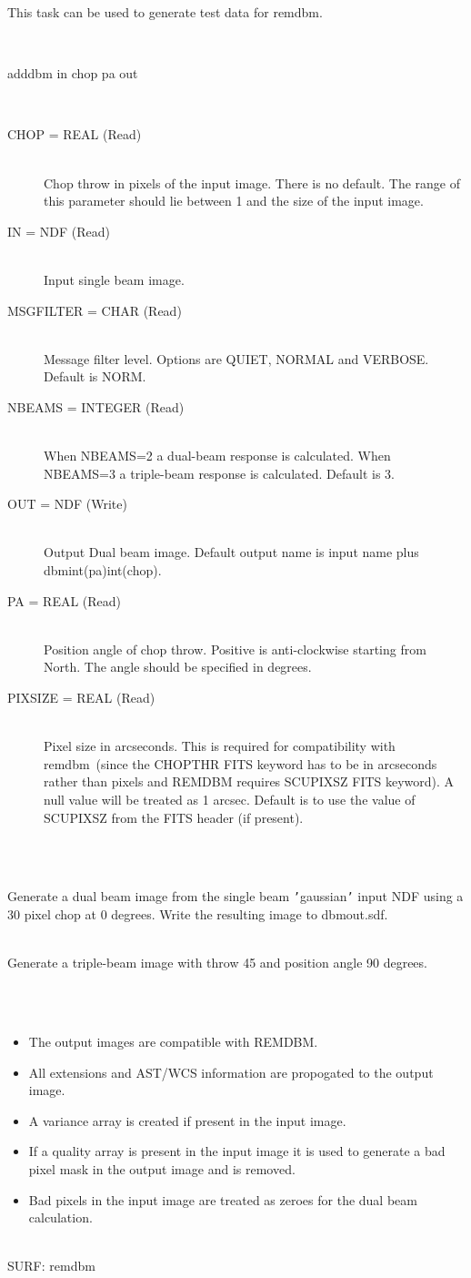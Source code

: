 \documentclass[twoside,11pt]{article}
\newcommand{\task}[1]{{\sf #1}}
\newcommand{\remdbm}{\htmlref{\task{remdbm}}{REMDBM}}
\newcommand{\htmlref}[2]{#1}
\renewcommand{\_}{\texttt{\symbol{95}}}
\newlength{\sstexampleslength}
\newcommand{\sstusage}[1]{\item[Usage:] \mbox{}
\\[1.3ex]{\raggedright \ssttt #1}}
\newcommand{\sstparameters}[1]{
   \item[Parameters:] \mbox{} \\
   \vspace{-3.5ex}
   \begin{description}
      #1
   \end{description}
}
\newcommand{\sstexamples}[1]{
   \item[Examples:] \mbox{} \\
   \vspace{-3.5ex}
   \begin{description}
      #1
   \end{description}
}
\newcommand{\sstsubsection}[1]{ \item[{#1}] \mbox{} \\}
\newcommand{\sstexamplesubsection}[2]{\sloppy
\item[\parbox{\sstexampleslength}{\ssttt #1}] \mbox{} \vspace{1.0ex}
\\ #2 }
\newcommand{\sstnotes}[1]{\item[Notes:] \mbox{} \\[1.3ex] #1}
\newcommand{\sstdiytopic}[2]{\item[{\hspace{-0.35em}#1\hspace{-0.35em}:}]
\mbox{} \\[1.3ex] #2}
\newcommand{\sstitemlist}[1]{
  \mbox{} \\
  \vspace{-3.5ex}
  \begin{itemize}
     #1
  \end{itemize}
}
\newcommand{\sstitem}{\item}
\newcommand{\sstusage}[1]{\item[Usage:]
      \begin{description}
         {\ssttt #1}
      \end{description}
      \\
   }
\newcommand{\sstparameters}[1]{
      \item[Parameters:] \\
      \begin{description}
         #1
      \end{description}
      \\
   }
\newcommand{\sstexamples}[1]{
      \item[Examples:] \\
      \begin{description}
         #1
      \end{description}
      \\
   }
\newcommand{\sstsubsection}[1]{\item[{#1}]}
\newcommand{\sstexamplesubsection}[2]{\item[{\ssttt #1}] #2}
\newcommand{\sstnotes}[1]{\item[Notes:] #1 }
\newcommand{\sstdiytopic}[2]{\item[{#1}] #2 }
\newcommand{\sstitemlist}[1]{
      \begin{itemize}
         #1
      \end{itemize}
      \\
   }
\newcommand{\sstitem}{\item}
\begin{document}
{{      This task can be used to generate test data for \remdbm.
   }
   \sstusage{
      add\_dbm in chop pa out
   }
   \sstparameters{
      \sstsubsection{
         CHOP = REAL (Read)
      }{
         Chop throw in pixels of the input image. There is no default.
         The range of this parameter should lie between 1 and the
         size of the input image.
      }
      \sstsubsection{
         IN = NDF (Read)
      }{
         Input single beam image.
      }
      \sstsubsection{
         MSG\_FILTER = CHAR (Read)
      }{
         Message filter level. Options are QUIET, NORMAL and
         VERBOSE. Default is NORM.
     } 
     \sstsubsection{
         NBEAMS = INTEGER (Read)
      }{
        When NBEAMS=2 a dual-beam response is calculated. When
        NBEAMS=3 a triple-beam response is calculated. Default 
        is 3.      
      }
      \sstsubsection{
         OUT = NDF (Write)
      }{
         Output Dual beam image. Default output name is input name
         plus \_dbm\_int(pa)\_int(chop).
      }
      \sstsubsection{
         PA = REAL (Read)
      }{
         Position angle of chop throw. Positive is anti-clockwise starting
         from North. The angle should be specified in degrees.
      }
      \sstsubsection{
         PIXSIZE = REAL (Read)
      }{
         Pixel size in arcseconds. This is required for compatibility
         with \remdbm\ (since the CHOP\_THR FITS keyword has to be in
         arcseconds rather than pixels and REMDBM requires SCUPIXSZ
         FITS keyword). A null value will be treated as 1 arcsec.
         Default is to use the value of SCUPIXSZ from the FITS header
         (if present).
      }
   }
   \sstexamples{
      \sstexamplesubsection{
         add\_dbm gaussian 0 30 dbm\_out
      }{
         Generate a dual beam image from the single beam {\tt '}gaussian{\tt '}
         input NDF using a 30 pixel chop at 0 degrees. Write the
         resulting image to dbm\_out.sdf.
      }
      \sstexamplesubsection{
         add\_dbm image 90 45 3bm\_out nbeams=3
      }{
       Generate a triple-beam image with throw 45 and position angle
       90 degrees.
      }

   }
   \sstnotes{
      \sstitemlist{

         \sstitem
         The output images are compatible with REMDBM.

         \sstitem
         All extensions and AST/WCS information are propogated to the
           output image.

         \sstitem
         A variance array is created if present in the input image.

         \sstitem
         If a quality array is present in the input image it is used
           to generate a bad pixel mask in the output image and is removed.

         \sstitem
        Bad pixels in the input image are treated as zeroes for the
       dual beam calculation.
      }
   }
   \sstdiytopic{
      Related Applications
   }{
      SURF: \remdbm
   }
}
\end{document}
